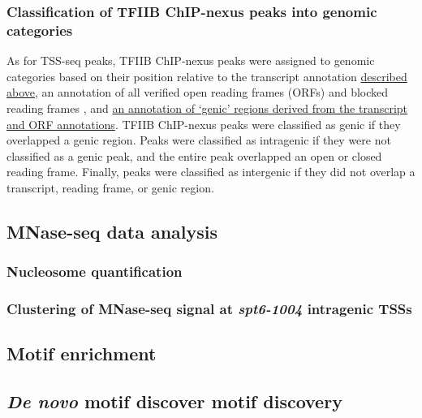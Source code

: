 \subsubsection{Classification of TFIIB ChIP-nexus peaks into genomic categories}

As for TSS-seq peaks, TFIIB ChIP-nexus peaks were assigned to genomic categories based on their position relative to the transcript annotation \hyperref[subsubsec:tss_reannotation]{described above}, an annotation of all verified open reading frames (ORFs) and blocked reading frames \citep{crooks2004, engel2014}, and \hyperref[subsubsec:tss_peak_classification]{an annotation of `genic' regions derived from the transcript and ORF annotations}.
TFIIB ChIP-nexus peaks were classified as genic if they overlapped a genic region.
Peaks were classified as intragenic if they were not classified as a genic peak, and the entire peak overlapped an open or closed reading frame.
Finally, peaks were classified as intergenic if they did not overlap a transcript, reading frame, or genic region.

\subsection{MNase-seq data analysis}

\subsubsection{Nucleosome quantification}

\subsubsection{Clustering of MNase-seq signal at \textit{spt6-1004} intragenic TSSs}

\subsection{Motif enrichment}

\subsection{\textit{De novo} motif discover motif discovery}

\clearpage

\begingroup
    \singlespacing
    
\endgroup
